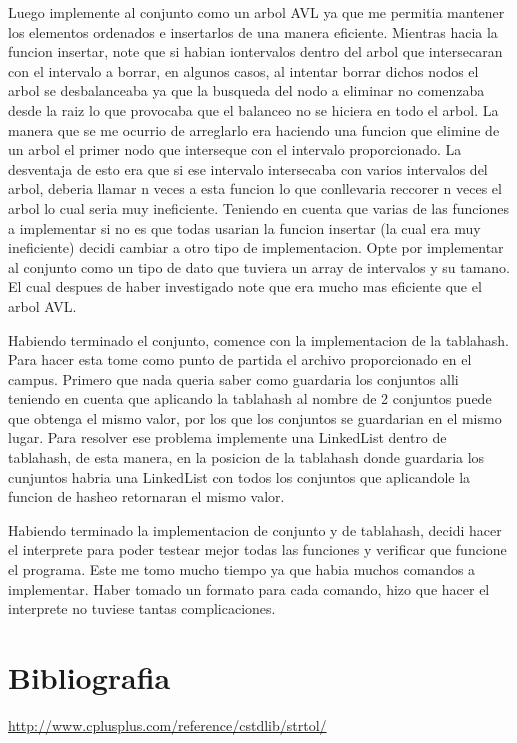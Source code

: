 \documentclass[]{article}
\begin{document}
Luego implemente al conjunto como un arbol AVL ya que me permitia mantener los elementos ordenados e insertarlos de una manera eficiente. Mientras hacia la funcion insertar, note que si habian iontervalos dentro del arbol que intersecaran con el intervalo a borrar, en algunos casos, al intentar borrar dichos nodos el arbol se desbalanceaba ya que la busqueda del nodo a eliminar no comenzaba desde la raiz lo que provocaba que el balanceo no se hiciera en todo el arbol. La manera que se me ocurrio de arreglarlo era haciendo una funcion que elimine de un arbol el primer nodo que interseque con el intervalo proporcionado. La desventaja de esto era que si ese intervalo intersecaba con varios intervalos del arbol, deberia llamar n veces a esta funcion lo que conllevaria reccorer n veces el arbol lo cual seria muy ineficiente. Teniendo en cuenta que varias de las funciones a implementar si no es que todas usarian la funcion insertar (la cual era muy ineficiente) decidi cambiar a otro tipo de implementacion. Opte por implementar al conjunto como un tipo de dato que tuviera un array de intervalos y su tamano. El cual despues de haber investigado note que era mucho mas eficiente que el arbol AVL.

Habiendo terminado el conjunto, comence con la implementacion de la tablahash. Para hacer esta tome como punto de partida el archivo proporcionado en el campus. Primero que nada queria saber como guardaria los conjuntos alli teniendo en cuenta que aplicando la tablahash al nombre de 2 conjuntos puede que obtenga el mismo valor, por los que los conjuntos se guardarian en el mismo lugar. Para resolver ese problema implemente una LinkedList dentro de tablahash, de esta manera, en la posicion de la tablahash donde guardaria los cunjuntos habria una LinkedList con todos los conjuntos que aplicandole la funcion de hasheo retornaran el mismo valor.

Habiendo terminado la implementacion de conjunto y de tablahash, decidi hacer el interprete para poder testear mejor todas las funciones y verificar que funcione el programa. Este me tomo mucho tiempo ya que habia muchos comandos a implementar. Haber tomado un formato para cada comando, hizo que hacer el interprete no tuviese tantas complicaciones.
\section{Bibliografia}
\url{http://www.cplusplus.com/reference/cstdlib/strtol/}\\
\end{document}
